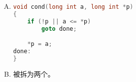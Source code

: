 {{        %
        \begin{practicec}
            \begin{enumerate}[A.]
                \item
                {
                    \begin{lstlisting}[language=C]
void cond(long int a, long int *p)
{
    if (!p || a <= *p)
        goto done;

    *p = a;
done:
}
                    \end{lstlisting}
                }
                \item
                {
                    \emcode{\&\&}被拆为两个。
                }
            \end{enumerate}
        \end{practicec}
    }
}
